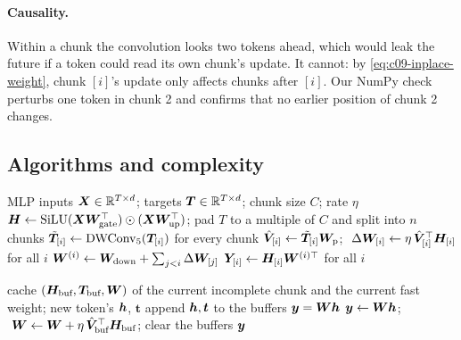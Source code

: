 \paragraph{Causality.} Within a chunk the convolution looks two tokens ahead, which would leak
the future if a token could read its own chunk's update. It cannot: by
\eqref{eq:c09-inplace-weight}, chunk $[i]$'s update only affects chunks after $[i]$. Our NumPy
check perturbs one token in chunk 2 and confirms that no earlier position of chunk 2 changes.

\subsection{Algorithms and complexity}

\begin{algorithm}[t]
\caption{In-Place TTT MLP: training and prefill (parallel form).}
\label{alg:c09-inplace}
\begin{algorithmic}[1]
\Require MLP inputs $\bm{X}\in\mathbb{R}^{T\times d}$; targets $\bm{T}\in\mathbb{R}^{T\times d}$; chunk size $C$; rate $\eta$
\State $\bm{H} \gets \operatorname{SiLU}(\bm{X}\bm{W}_{\text{gate}}^{\top})\odot(\bm{X}\bm{W}_{\text{up}}^{\top})$; pad $T$ to a multiple of $C$ and split into $n$ chunks
\State $\tilde{\bm{T}}_{[i]} \gets \operatorname{DWConv}_5(\bm{T}_{[i]})$ for every chunk 
\State $\hat{\bm{V}}_{[i]} \gets \tilde{\bm{T}}_{[i]}\bm{W}_{\mathrm{p}}$; $\ \Delta\mW_{[i]} \gets \eta\,\hat\mV_{[i]}\T\mH_{[i]}$ for all $i$ 
\State $\bm{W}^{(i)} \gets \bm{W}_{\text{down}} + \sum_{j<i}\Delta\bm{W}_{[j]}$ 
\State $\bm{Y}_{[i]} \gets \bm{H}_{[i]}\bm{W}^{(i)\top}$ for all $i$
\end{algorithmic}
\end{algorithm}

\begin{algorithm}[t]
\caption{In-Place TTT MLP: decoding one token.}
\label{alg:c09-inplace-decode}
\begin{algorithmic}[1]
\Require cache $(\bm{H}_{\text{buf}}, \bm{T}_{\text{buf}}, \bm{W})$ of the current incomplete chunk and the current fast weight; new token's $\bm{h}$, $\bm{t}$
\State append $\bm{h}, \bm{t}$ to the buffers
  \State \Return $\bm{y} = \bm{W}\bm{h}$ 
\Else
  \State $\bm{y} \gets \bm{W}\bm{h}$; $\ \bm{W} \gets \bm{W} + \eta\,\hat{\bm{V}}_{\text{buf}}^{\top}\bm{H}_{\text{buf}}$; clear the buffers \Comment{\eqref{eq:c09-inplace-update}}
  \State \Return $\bm{y}$
\EndIf
\end{algorithmic}
\end{algorithm}

